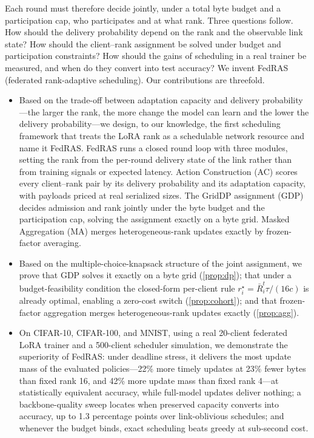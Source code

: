 \documentclass[a4paper,fleqn]{cas-dc}
\begin{document}
\par
Each round must therefore decide jointly, under a total byte budget and a participation cap, who participates and at what rank. Three questions follow. How should the delivery probability depend on the rank and the observable link state? How should the client--rank assignment be solved under budget and participation constraints? How should the gains of scheduling in a real trainer be measured, and when do they convert into test accuracy? We invent FedRAS (federated rank-adaptive scheduling). Our contributions are threefold.
\begin{itemize}
\item Based on the trade-off between adaptation capacity and delivery probability---the larger the rank, the more change the model can learn and the lower the delivery probability---we design, to our knowledge, the first scheduling framework that treats the LoRA rank as a schedulable network resource and name it FedRAS. FedRAS runs a closed round loop with three modules, setting the rank from the per-round delivery state of the link rather than from training signals or expected latency. Action Construction (AC) scores every client--rank pair by its delivery probability and its adaptation capacity, with payloads priced at real serialized sizes. The GridDP assignment (GDP) decides admission and rank jointly under the byte budget and the participation cap, solving the assignment exactly on a byte grid. Masked Aggregation (MA) merges heterogeneous-rank updates exactly by frozen-factor averaging.
\item Based on the multiple-choice-knapsack structure of the joint assignment, we prove that GDP solves it exactly on a byte grid (\cref{prop:dp}); that under a budget-feasibility condition the closed-form per-client rule $r_i^\star=\bar R_i^t\tau/(16c)$ is already optimal, enabling a zero-cost switch (\cref{prop:cohort}); and that frozen-factor aggregation merges heterogeneous-rank updates exactly (\cref{prop:agg}).
\item On CIFAR-10, CIFAR-100, and MNIST, using a real 20-client federated LoRA trainer and a 500-client scheduler simulation, we demonstrate the superiority of FedRAS: under deadline stress, it delivers the most update mass of the evaluated policies---22\% more timely updates at 23\% fewer bytes than fixed rank 16, and 42\% more update mass than fixed rank 4---at statistically equivalent accuracy, while full-model updates deliver nothing; a backbone-quality sweep locates when preserved capacity converts into accuracy, up to 1.3 percentage points over link-oblivious schedules; and whenever the budget binds, exact scheduling beats greedy at sub-second cost.
\end{itemize}
\end{document}
